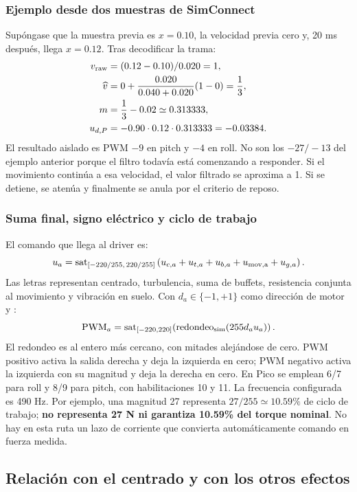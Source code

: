 \documentclass[11pt,a4paper]{article}
\newcommand{\code}[1]{\texttt{\detokenize{#1}}}
\newcommand{\sat}{\operatorname{sat}}
\begin{document}
\subsubsection{Ejemplo desde dos muestras de SimConnect}
Supóngase que la muestra previa es $x=0.10$, la velocidad previa cero y, 20 ms después, llega $x=0.12$. Tras decodificar la trama:
\begin{align}
v_{\rm raw}&=(0.12-0.10)/0.020=1,\\
\widehat v&=0+\frac{0.020}{0.040+0.020}(1-0)=\frac13,\\
m&=\frac13-0.02\simeq0.313333,\\
u_{d,P}&=-0.90\cdot0.12\cdot0.313333=-0.03384.
\end{align}
El resultado aislado es PWM $-9$ en pitch y $-4$ en roll. No son los $-27/-13$ del ejemplo anterior porque el filtro todavía está comenzando a responder. Si el movimiento continúa a esa velocidad, el valor filtrado se aproxima a 1. Si se detiene, se atenúa y finalmente se anula por el criterio de reposo.

\subsubsection{Suma final, signo eléctrico y ciclo de trabajo}
El comando que llega al driver es:
\begin{equation}
u_a=\sat_{[-220/255,\,220/255]}
\left(u_{c,a}+u_{t,a}+u_{b,a}+u_{\rm mov,a}+u_{g,a}\right).
\end{equation}
Las letras representan centrado, turbulencia, suma de buffets, resistencia conjunta al movimiento y vibración en suelo. Con $d_a\in\{-1,+1\}$ como dirección de motor y \code{PWM_MAX=255}:
\begin{equation}
\mathrm{PWM}_a=\sat_{[-220,220]}\!\left(\operatorname{redondeo}_{\rm sim}(255d_au_a)\right).
\end{equation}
El redondeo es al entero más cercano, con mitades alejándose de cero. PWM positivo activa la salida derecha y deja la izquierda en cero; PWM negativo activa la izquierda con su magnitud y deja la derecha en cero. En Pico se emplean 6/7 para roll y 8/9 para pitch, con habilitaciones 10 y 11. La frecuencia configurada es 490 Hz. Por ejemplo, una magnitud 27 representa $27/255\simeq10.59\%$ de ciclo de trabajo; \textbf{no representa 27 N ni garantiza 10.59\% del torque nominal}. No hay en esta ruta un lazo de corriente que convierta automáticamente comando en fuerza medida.

\subsection{Relación con el centrado y con los otros efectos}
\end{document}
